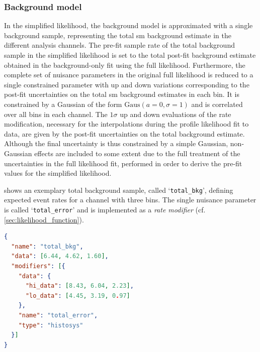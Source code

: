 \subsubsection{Background model}

In the simplified likelihood, the background model is approximated with a single background sample, representing the total \gls{sm} background estimate in the different analysis channels.
The pre-fit sample rate of the total background sample in the simplified likelihood is set to the total post-fit background estimate obtained in the background-only fit using the full likelihood.
Furthermore, the complete set of nuisance parameters in the original full likelihood is reduced to a single constrained parameter with up and down variations corresponding to the post-fit uncertainties on the total \gls{sm} background estimates in each bin.
It is constrained by a Gaussian of the form $\mathrm{Gaus}(a = 0, \sigma = 1)$ and is correlated over all bins in each channel. The $1\sigma$ up and down evaluations of the rate modification, necessary for the interpolations during the profile likelihood fit to data, are given by the post-fit uncertainties on the total background estimate.
Although the final uncertainty is thus constrained by a simple Gaussian, non-Gaussian effects are included to some extent due to the full treatment of the uncertainties in the full likelihood fit, performed in order to derive the pre-fit values for the simplified likelihood.

 shows an exemplary total background sample, called `\texttt{total\_bkg}', defining expected event rates for a channel with three bins. The single nuisance parameter is called `\texttt{total\_error}' and is implemented as a \textit{rate modifier} (cf. \cref{sec:likelihood_function}).

\begin{minipage}{\linewidth}
\begin{lstlisting}[language=json,firstnumber=1,caption={Exemplary total background sample with sample rate and total uncertainty for three separate bins, derived from a fit in the \glspl{sr} and \glspl{cr} using the full likelihood. The \texttt{histosys} type modifier in \lib{HistFactory} implements a shape uncertainty correlated over all bins.},captionpos=b, label=lst:bkg_sample]
{
  "name": "total_bkg",
  "data": [6.44, 4.62, 1.60],
  "modifiers": [{
    "data": {
      "hi_data": [8.43, 6.04, 2.23], 
      "lo_data": [4.45, 3.19, 0.97]
    }, 
    "name": "total_error",
    "type": "histosys"
  }]
}
\end{lstlisting}
\end{minipage}

